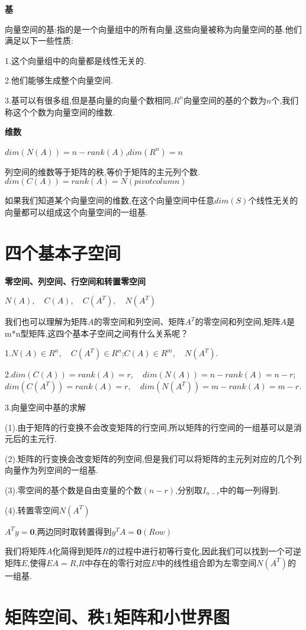 \documentclass[oneside]{book}
\begin{document}
	\textbf{基}
	
	向量空间的基:指的是一个向量组中的所有向量,这些向量被称为向量空间的基.他们满足以下一些性质:
	
	1.这个向量组中的向量都是线性无关的.
	
	2.他们能够生成整个向量空间.
	
	3.基可以有很多组,但是基向量的向量个数相同,$R^{n}$向量空间的基的个数为$n$个,我们称这个个数为向量空间的维数.
	
	\textbf{维数}
	
	$dim(N(A))=n-rank(A)$,\qquad $dim(R^{n})=n$
	
	列空间的维数等于矩阵的秩,等价于矩阵的主元列个数.
	$dim(C(A))=rank(A)=N(pivot column)$
	
	如果我们知道某个向量空间的维数,在这个向量空间中任意$dim(S)$个线性无关的向量都可以组成这个向量空间的一组基.
	\chapter{四个基本子空间}
	\textbf{零空间、列空间、行空间和转置零空间}
	
	$N(A),\quad C(A),\quad C(A^{T}),\quad N(A^{T}) $
	
	我们也可以理解为矩阵$A$的零空间和列空间、矩阵$A^{T}$的零空间和列空间,矩阵$A$是m*n型矩阵,这四个基本子空间之间有什么关系呢？
	
	1.$N(A) \in R^{n},\quad C(A^{T})\in R^{n}$;\qquad $C(A)\in R^{m},\quad N(A^{T})$.
	
	2.$dim(C(A))=rank(A)=r,\quad dim(N(A))=n-rank(A)=n-r$;\qquad $dim(C(A^{T}))=rank(A)=r,\quad dim(N(A^{T}))=m-rank(A)=m-r$.
	
	3.向量空间中基的求解
	
	(1).由于矩阵的行变换不会改变矩阵的行空间,所以矩阵的行空间的一组基可以是消元后的主元行.
	
	(2).矩阵的行变换会改变矩阵的列空间,但是我们可以将矩阵的主元列对应的几个列向量作为列空间的一组基.
	
	(3).零空间的基个数是自由变量的个数$(n-r)$,分别取$I_{n-r}$中的每一列得到.
	
	(4).转置零空间$N(A^{T})$
	
	$A^{T}y=\textbf{0}$,两边同时取转置得到$y^{T}A=\textbf{0}(Row)$
	
	我们将矩阵$A$化简得到矩阵$R$的过程中进行初等行变化,因此我们可以找到一个可逆矩阵$E$,使得$EA=R$,$R$中存在的零行对应$E$中的线性组合即为左零空间$N(A^{T})$的一组基.
	\chapter{矩阵空间、秩1矩阵和小世界图}
	
\end{document}
